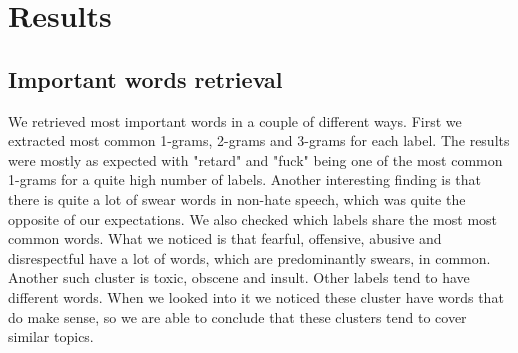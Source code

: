 \documentclass[fleqn,moreauthors,10pt]{ds_report}
\begin{document}



\section*{Results}

\subsection*{Important words retrieval}

We retrieved most important words in a couple of different ways. First we extracted most common 1-grams, 2-grams and 3-grams for each label. The results were mostly as expected with "retard" and "fuck" being one of the most common 1-grams for a quite high number of labels. Another interesting finding is that there is quite a lot of swear words in non-hate speech, which was quite the opposite of our expectations. We also checked which labels share the most most common words. What we noticed is that fearful, offensive, abusive and disrespectful have a lot of words, which are predominantly swears, in common. Another such cluster is toxic, obscene and insult. Other labels tend to have different words. When we looked into it we noticed these cluster have words that do make sense, so we are able to conclude that these clusters tend to cover similar topics.
\end{document}
